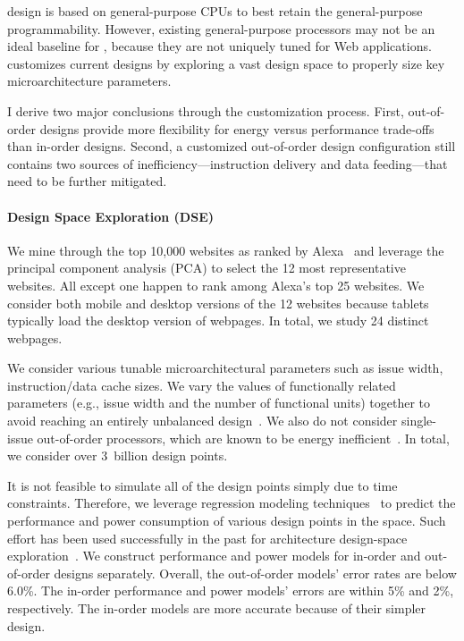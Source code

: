 \webcore design is based on general-purpose CPUs to best retain the general-purpose programmability. However, existing general-purpose processors may not be an ideal baseline for \webcore, because they are not uniquely tuned for Web applications. \webcore customizes current designs by exploring a vast design space to properly size key microarchitecture parameters.

I derive two major conclusions through the customization process. First, out-of-order designs provide more flexibility for energy versus performance trade-offs than in-order designs. Second, a customized out-of-order design configuration still contains two sources of inefficiency---instruction delivery and data feeding---that need to be further mitigated.

\paragraph{Design Space Exploration (DSE)} We mine through the top 10,000 websites as ranked by Alexa~\cite{alexa} and leverage the principal component analysis (PCA) to select the 12 most representative websites. All except one happen to rank among Alexa's top 25 websites. We consider both mobile and desktop versions of the 12 websites because tablets typically load the desktop version of webpages. In total, we study 24 distinct webpages.

We consider various tunable microarchitectural parameters such as issue width, instruction/data cache sizes. We vary the values of functionally related parameters (e.g., issue width and the number of functional units) together to avoid reaching an entirely unbalanced design~\cite{ilp2}. We also do not consider single-issue out-of-order processors, which are known to be energy inefficient~\cite{marginal}. In total, we consider over 3~billion design points.

It is not feasible to simulate all of the design points simply due to time constraints. Therefore, we leverage regression modeling techniques~\cite{RMS} to predict the performance and power consumption of various design points in the space. Such effort has been used successfully in the past for architecture design-space exploration~\cite{dse, comt}. We construct performance and power models for in-order and out-of-order designs separately. Overall, the out-of-order models' error rates are below 6.0\%. The in-order performance and power models' errors are within 5\% and 2\%, respectively. The in-order models are more accurate because of their simpler design.

